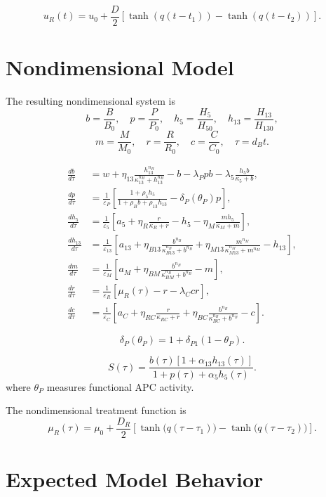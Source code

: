 \documentclass[11pt]{article}
\begin{document}
\[
u_R(t)
=
u_0
+
\frac{D}{2}
\left[
\tanh(q(t-t_1))
-
\tanh(q(t-t_2))
\right].
\]

\section{Nondimensional Model}

The resulting nondimensional system is
\[
b=\frac{B}{B_0},\quad
p=\frac{P}{P_0},\quad
h_5=\frac{H_5}{H_{50}},\quad
h_{13}=\frac{H_{13}}{H_{130}},
\]
\[
m=\frac{M}{M_0},\quad
r=\frac{R}{R_0},\quad
c=\frac{C}{C_0},\quad
\tau=d_Bt.
\]

\begin{align}
\frac{db}{d\tau}
&=
w
+
\eta_{13}\frac{h_{13}^{n_H}}{\kappa_{13}^{n_H}+h_{13}^{n_H}}
-
b
-
\lambda_Ppb
-
\lambda_5\frac{h_5b}{\kappa_5+b},
\\
\frac{dp}{d\tau}
&=
\frac{1}{\varepsilon_P}
\left[
\frac{1+\rho_5h_5}
{1+\rho_Bb+\rho_{13}h_{13}}
-
\delta_P(\theta_P)p
\right],
\\
\frac{dh_5}{d\tau}
&=
\frac{1}{\varepsilon_5}
\left[
a_5
+
\eta_R\frac{r}{\kappa_R+r}
-
h_5
-
\eta_M\frac{mh_5}{\kappa_M+m}
\right],
\\
\frac{dh_{13}}{d\tau}
&=
\frac{1}{\varepsilon_{13}}
\left[
a_{13}
+
\eta_{B13}\frac{b^{n_B}}{\kappa_{B13}^{n_B}+b^{n_B}}
+
\eta_{M13}\frac{m^{n_M}}{\kappa_{M13}^{n_M}+m^{n_M}}
-
h_{13}
\right],
\\
\frac{dm}{d\tau}
&=
\frac{1}{\varepsilon_M}
\left[
a_M
+
\eta_{BM}\frac{b^{n_B}}{\kappa_{BM}^{n_B}+b^{n_B}}
-
m
\right],
\\
\frac{dr}{d\tau}
&=
\frac{1}{\varepsilon_R}
\left[
\mu_R(\tau)
-
r
-
\lambda_Ccr
\right],
\\
\frac{dc}{d\tau}
&=
\frac{1}{\varepsilon_C}
\left[
a_C
+
\eta_{RC}\frac{r}{\kappa_{RC}+r}
+
\eta_{BC}\frac{b^{n_B}}{\kappa_{BC}^{n_B}+b^{n_B}}
-
c
\right].
\end{align}

\[
\delta_P(\theta_P)=1+\delta_{P1}(1-\theta_P).
\]

\[
S(\tau)
=
\frac{
b(\tau)\left[1+\alpha_{13}h_{13}(\tau)\right]
}
{
1+p(\tau)+\alpha_5h_5(\tau)
}.
\]
where $\theta_P$ measures functional APC activity.

The nondimensional treatment function is
\begin{equation}
\mu_R(\tau)
=
\mu_0
+
\frac{D_R}{2}
\left[
\tanh\!\big(q(\tau-\tau_1)\big)
-
\tanh\!\big(q(\tau-\tau_2)\big)
\right].
\end{equation}

\section{Expected Model Behavior}
\end{document}
